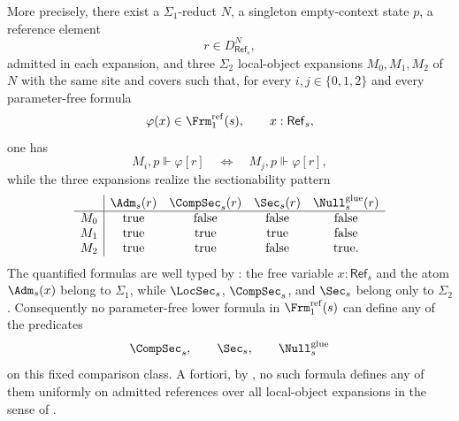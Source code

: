 \begin{theorem}
More precisely, there exist a $\Sigma_1$-reduct $N$, a singleton empty-context state $p$, a reference element
\[
r\in D_{\mathsf{Ref}_s}^{N},
\]
admitted in each expansion, and three $\Sigma_2$ local-object expansions $M_0,M_1,M_2$ of $N$ with the same site and covers such that, for every $i,j\in\{0,1,2\}$ and every parameter-free formula
\[
\varphi(x)\in\Frm_1^{\mathrm{ref}}(s),
\qquad x:\mathsf{Ref}_s,
\]
one has
\[
M_i,p\Vdash\varphi[r]
\quad\Longleftrightarrow\quad
M_j,p\Vdash\varphi[r],
\]
while the three expansions realize the sectionability pattern
\[
\begin{array}{c|cccc}
 & \Adm_s(r) & \CompSec_s(r) & \Sec_s(r) & \Null^{\mathrm{glue}}_s(r)\\ \hline
M_0 & \text{true} & \text{false} & \text{false} & \text{false}\\
M_1 & \text{true} & \text{true} & \text{true} & \text{false}\\
M_2 & \text{true} & \text{true} & \text{false} & \text{true}.
\end{array}
\]
The quantified formulas are well typed by : the free variable $x:\mathsf{Ref}_s$ and the atom $\Adm_s(x)$ belong to $\Sigma_1$, while $\LocSec_s$, $\CompSec_s$, and $\Sec_s$ belong only to $\Sigma_2$. Consequently no parameter-free lower formula in $\Frm_1^{\mathrm{ref}}(s)$ can define any of the predicates
\[
\CompSec_s,
\qquad
\Sec_s,
\qquad
\Null^{\mathrm{glue}}_s
\]
on this fixed comparison class. A fortiori, by , no such formula defines any of them uniformly on admitted references over all local-object expansions in the sense of .
\end{theorem}

